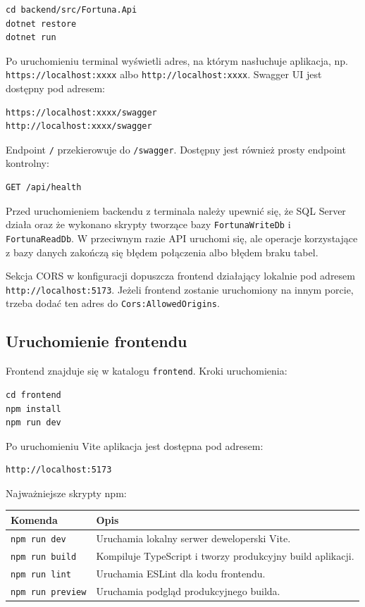 \documentclass[12pt,a4paper]{article}
\begin{document}
\begin{verbatim}
cd backend/src/Fortuna.Api
dotnet restore
dotnet run
\end{verbatim}

Po uruchomieniu terminal wyświetli adres, na którym nasłuchuje aplikacja, np. \texttt{https://localhost:xxxx} albo \texttt{http://localhost:xxxx}. Swagger UI jest dostępny pod adresem:

\begin{verbatim}
https://localhost:xxxx/swagger
http://localhost:xxxx/swagger
\end{verbatim}

Endpoint \texttt{/} przekierowuje do \texttt{/swagger}. Dostępny jest również prosty endpoint kontrolny:

\begin{verbatim}
GET /api/health
\end{verbatim}

Przed uruchomieniem backendu z terminala należy upewnić się, że SQL Server działa oraz że wykonano skrypty tworzące bazy \texttt{FortunaWriteDb} i \texttt{FortunaReadDb}. W przeciwnym razie API uruchomi się, ale operacje korzystające z bazy danych zakończą się błędem połączenia albo błędem braku tabel.

Sekcja CORS w konfiguracji dopuszcza frontend działający lokalnie pod adresem \texttt{http://localhost:5173}. Jeżeli frontend zostanie uruchomiony na innym porcie, trzeba dodać ten adres do \texttt{Cors:AllowedOrigins}.

\subsection{Uruchomienie frontendu}

Frontend znajduje się w katalogu \texttt{frontend}. Kroki uruchomienia:

\begin{verbatim}
cd frontend
npm install
npm run dev
\end{verbatim}

Po uruchomieniu Vite aplikacja jest dostępna pod adresem:

\begin{verbatim}
http://localhost:5173
\end{verbatim}

Najważniejsze skrypty npm:

\begin{longtable}{p{}p{}}
\toprule
\textbf{Komenda} & \textbf{Opis} \\
\midrule
\endhead
\texttt{npm run dev} & Uruchamia lokalny serwer deweloperski Vite. \\
\texttt{npm run build} & Kompiluje TypeScript i tworzy produkcyjny build aplikacji. \\
\texttt{npm run lint} & Uruchamia ESLint dla kodu frontendu. \\
\texttt{npm run preview} & Uruchamia podgląd produkcyjnego builda. \\
\bottomrule
\end{longtable}
\end{document}
